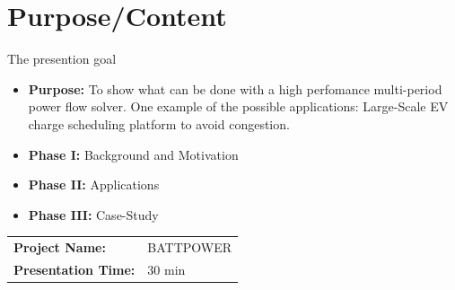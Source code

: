 \documentclass{beamer}
\begin{document}
\section{Purpose/Content}
\begin{frame}{The presention goal}
\begin{itemize}
\item \textbf{Purpose:} To show what can be done with a high perfomance multi-period power flow solver. One example of the possible applications: Large-Scale EV charge scheduling platform to avoid congestion. 
\item \textbf{Phase I:} Background and Motivation
\item \textbf{Phase II:} Applications
\item \textbf{Phase III:} Case-Study
\end{itemize}
\begin{center}
\begin{tabular}{|l l|} 
\hline
\rowcolor{Gray} \textbf{Project Name:} &BATTPOWER \\
\textbf{Presentation Time:}& 30 min \\
\hline
\end{tabular}
\end{center}
\end{frame}


\end{document}
